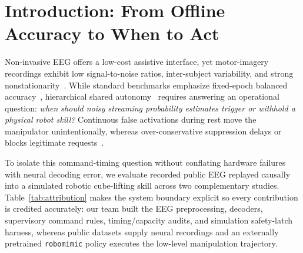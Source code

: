 \documentclass{article}
\begin{document}
\section{Introduction: From Offline Accuracy to When to Act}
\label{sec:intro}

Non-invasive EEG offers a low-cost assistive interface, yet motor-imagery recordings exhibit low signal-to-noise ratios, inter-subject variability, and strong nonstationarity~\citep{wolpaw2002,mcfarland2017,lotte2018}. While standard benchmarks emphasize fixed-epoch balanced accuracy~\citep{jayaram2018}, hierarchical shared autonomy~\citep{akinola2017} requires answering an operational question: \emph{when should noisy streaming probability estimates trigger or withhold a physical robot skill?} Continuous false activations during rest move the manipulator unintentionally, whereas over-conservative suppression delays or blocks legitimate requests~\citep{carrara2023}.

To isolate this command-timing question without conflating hardware failures with neural decoding error, we evaluate recorded public EEG replayed causally into a simulated robotic cube-lifting skill across two complementary studies. Table~\ref{tab:attribution} makes the system boundary explicit so every contribution is credited accurately: our team built the EEG preprocessing, decoders, supervisory command rules, timing/capacity audits, and simulation safety-latch harness, whereas public datasets supply neural recordings and an externally pretrained \texttt{robomimic} policy executes the low-level manipulation trajectory.
\end{document}
